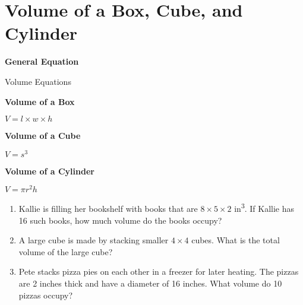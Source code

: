 \section[Volumes]{Volume of a Box, Cube, and Cylinder}

\textbf{General Equation}

\bigskip
\begin{equationbox}{Volume Equations}
\setlength{\columnseprule}{0pt}

\begin{center}
\begin{multicols}{3}
\textbf{Volume of a Box}

$V=l\times w\times h$

\textbf{Volume of a Cube}

$V=s^3$

\textbf{Volume of a Cylinder}

$V=\pi r^2h$
\end{multicols}
\end{center}
\end{equationbox}

\bigskip
\begin{enumerate}[labelindent=*,style=multiline,leftmargin=*,label=\textbf{Example \arabic*:}]
\item Kallie is filling her bookshelf with books that are $8\times5\times2$ in\textsuperscript{3}. If Kallie has 16 such books, how much volume do the books occupy?

\vfill\item A large cube is made by stacking smaller $4\times4$ cubes. What is the total volume of the large cube?

\vfill\item Pete stacks pizza pies on each other in a freezer for later heating. The pizzas are 2 inches thick and have a diameter of 16 inches. What volume do 10 pizzas occupy?
\end{enumerate}

